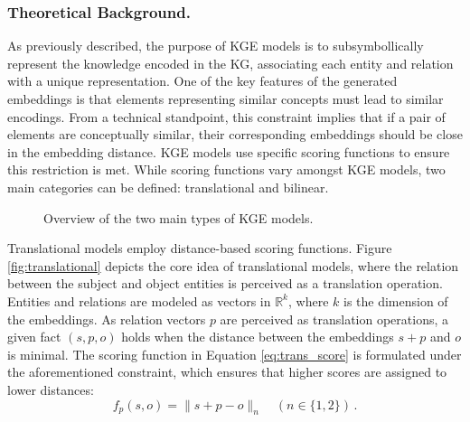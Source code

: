 \subsubsection{Theoretical Background.} \label{subsec:s4_theoretical_back}
As previously described, the purpose of KGE models is to subsymbollically represent the knowledge encoded in the KG, associating each entity and relation with a unique representation. One of the key features of the generated embeddings is that elements representing similar concepts must lead to similar encodings. From a technical standpoint, this constraint implies that if a pair of elements are conceptually similar, their corresponding embeddings should be close in the embedding distance. KGE models use specific scoring functions to ensure this restriction is met. While scoring functions vary amongst KGE models, two main categories can be defined: translational and bilinear. 

\begin{figure}[t!]
    \centering
    \qquad
    \caption{Overview of the two main types of KGE models.}
    \label{fig:kge_overview}
\end{figure}

Translational models employ distance-based scoring functions. Figure \ref{fig:translational} depicts the core idea of translational models, where the relation between the subject and object entities is perceived as a translation operation. Entities and relations are modeled as vectors in ${\mathbb{R}}^{k}$, where $k$ is the dimension of the embeddings. As relation vectors $p$ are perceived as translation operations, a given fact $(s,p,o)$ holds when the distance between the embeddings $s+p$ and $o$ is minimal. The scoring function in Equation \ref{eq:trans_score} is formulated under the aforementioned constraint, which ensures that higher scores are assigned to lower distances:
\begin{equation}\label{eq:trans_score}
    f_p(s,o)=\|s + p - o\|_n
    \quad
    ( n \in \{1,2\})\,.
\end{equation} 

